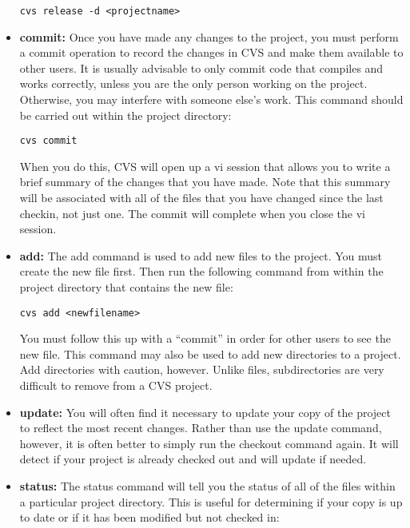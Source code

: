 \documentclass[11pt, letterpaper]{article}
\begin{document}
\begin{itemize}
\begin{verbatim}
cvs release -d <projectname>
\end{verbatim}

	\item \textbf{commit:} Once you have made any changes to the project,
	you must perform a commit operation to record the changes in CVS and make
	them available to other users.  It is usually advisable to only
	commit code that compiles and works correctly, unless you are the
	only person working on the project.  Otherwise, you may interfere
	with someone else's work.  This command should be carried out within
	the project directory:

\begin{verbatim}
cvs commit
\end{verbatim}

	When you do this, CVS will open up a vi session that allows you to
	write a brief summary of the changes that you have made.  Note that
	this summary will be associated with all of the files that you have
	changed since the last checkin, not just one.  The commit will
	complete when you close the vi session.

	\item \textbf{add:} The add command is used to add new files to the
	project.  You must create the new file first.  Then run the following
	command from within the project directory that contains the new file:

\begin{verbatim}
cvs add <newfilename>
\end{verbatim}

	You must follow this up with a ``commit'' in order for other users to
	see the new file.  This command may also be used to add new
	directories to a project.  Add directories with caution, however.
	Unlike files, subdirectories are very difficult to remove from a CVS
	project.

	\item \textbf{update:} You will often find it necessary to 
	update your copy of the project
	to reflect the most recent changes.  Rather than use the update
	command, however, it is
	often better to simply run the checkout command again.  It will
	detect if your project is already checked out and will update if
	needed.  

	\item \textbf{status:} The status command will tell you the status of
	all of the files within a particular project directory.  This is useful for 
	determining if your copy is up to date or if it has been modified but
	not checked in:


\end{itemize}
\end{document}
